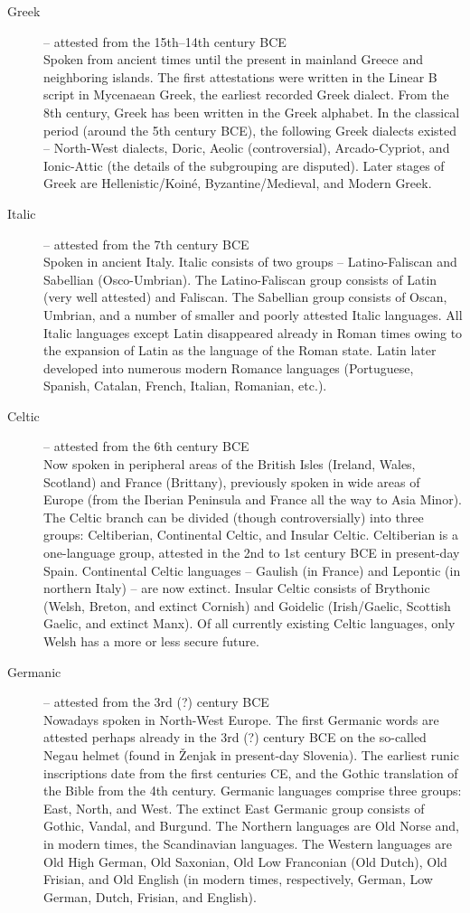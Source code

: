 \begin{description}
\item[Greek] – attested from the 15th–14th century BCE\\
Spoken from ancient times until the present in mainland Greece and neighboring
islands. The first attestations were written in the Linear B script in Mycenaean Greek,
the earliest recorded Greek dialect. From the 8th century, Greek has been written in
the Greek alphabet. In the classical period (around the 5th century BCE), the following
Greek dialects existed – North-West dialects, Doric, Aeolic (controversial),
Arcado-Cypriot, and Ionic-Attic (the details of the subgrouping are disputed). Later
stages of Greek are Hellenistic/Koiné, Byzantine/Medieval, and Modern Greek.

\item[Italic] – attested from the 7th century BCE\\
Spoken in ancient Italy. Italic consists of two groups – Latino-Faliscan and Sabellian
(Osco-Umbrian). The Latino-Faliscan group consists of Latin (very well attested)
and Faliscan. The Sabellian group consists of Oscan, Umbrian, and a number of
smaller and poorly attested Italic languages. All Italic languages except Latin disappeared
already in Roman times owing to the expansion of Latin as the language of
the Roman state. Latin later developed into numerous modern Romance languages
(Portuguese, Spanish, Catalan, French, Italian, Romanian, etc.).

\item[Celtic] – attested from the 6th century BCE\\
Now spoken in peripheral areas of the British Isles (Ireland, Wales, Scotland) and
France (Brittany), previously spoken in wide areas of Europe (from the Iberian Peninsula
and France all the way to Asia Minor). The Celtic branch can be divided
(though controversially) into three groups: Celtiberian, Continental Celtic, and Insular
Celtic. Celtiberian is a one-language group, attested in the 2nd to 1st century
BCE in present-day Spain. Continental Celtic languages – Gaulish (in France) and
Lepontic (in northern Italy) – are now extinct. Insular Celtic consists of Brythonic
(Welsh, Breton, and extinct Cornish) and Goidelic (Irish/Gaelic, Scottish Gaelic, and
extinct Manx). Of all currently existing Celtic languages, only Welsh has a more or
less secure future.

\item[Germanic] – attested from the 3rd (?) century BCE\\
Nowadays spoken in North-West Europe. The first Germanic words are attested perhaps
already in the 3rd (?) century BCE on the so-called Negau helmet (found in 
Ženjak in present-day Slovenia). The earliest runic inscriptions date from the first
centuries CE, and the Gothic translation of the Bible from the 4th century. Germanic
languages comprise three groups: East, North, and West. The extinct East Germanic
group consists of Gothic, Vandal, and Burgund. The Northern languages are Old
Norse and, in modern times, the Scandinavian languages. The Western languages
are Old High German, Old Saxonian, Old Low Franconian (Old Dutch), Old Frisian,
and Old English (in modern times, respectively, German, Low German, Dutch, Frisian,
and English).


\end{description}
